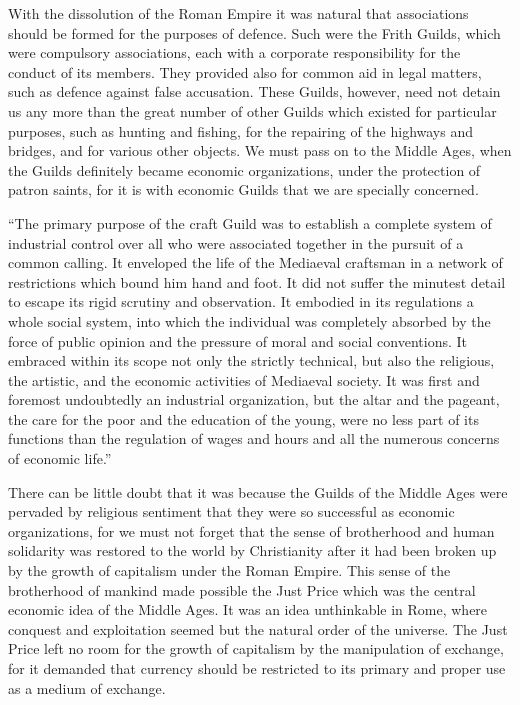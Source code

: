 \documentclass{book}
\begin{document}
With the dissolution of the Roman Empire it was natural that associations should be formed for the purposes of defence. Such were the Frith Guilds, which were compulsory associations, each with a corporate responsibility for the conduct of its members. They provided also for common aid in legal matters, such as defence against false accusation. These Guilds, however, need not detain us any more than the great number of other Guilds which existed for particular purposes, such as hunting and fishing, for the repairing of the highways and bridges, and for various other objects. We must pass on to the Middle Ages, when the Guilds definitely became economic organizations, under the protection of patron saints, for it is with economic Guilds that we are specially concerned.

“The primary purpose of the craft Guild was to establish a complete system of industrial control over all who were associated together in the pursuit of a common calling. It enveloped the life of the Mediaeval craftsman in a network of restrictions which bound him hand and foot. It did not suffer the minutest detail to escape its rigid scrutiny and observation. It embodied in its regulations a whole social system, into which the individual was completely absorbed by the force of public opinion and the pressure of moral and social conventions. It embraced within its scope not only the strictly technical, but also the religious, the artistic, and the economic activities of Mediaeval society. It was first and foremost undoubtedly an industrial organization, but the altar and the pageant, the care for the poor and the education of the young, were no less part of its functions than the regulation of wages and hours and all the numerous concerns of economic life.”\footnotemark[3]

There can be little doubt that it was because the Guilds of the Middle Ages were pervaded by religious sentiment that they were so successful as economic organizations, for we must not forget that the sense of brotherhood and human solidarity was restored to the world by Christianity after it had been broken up by the growth of capitalism under the Roman Empire. This sense of the brotherhood of mankind made possible the Just Price which was the central economic idea of the Middle Ages. It was an idea unthinkable in Rome, where conquest and exploitation seemed but the natural order of the universe. The Just Price left no room for the growth of capitalism by the manipulation of exchange, for it demanded that currency should be restricted to its primary and proper use as a medium of exchange.
\end{document}
